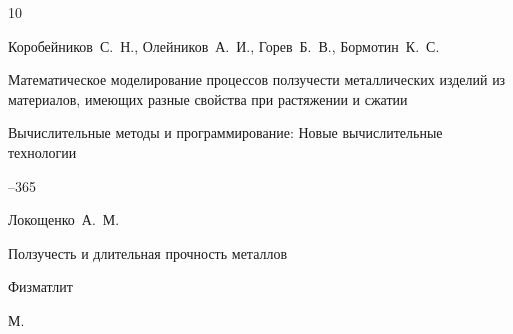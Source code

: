 \begin{thebibliography}{10}





\by  Коробейников~С.~Н., Олейников~А.~И., Горев~Б.~В., Бормотин~К.~С.

\paper Математическое моделирование процессов ползучести металлических изделий из материалов, имеющих разные свойства при растяжении и сжатии

\jour Вычислительные методы и программирование: Новые вычислительные технологии 




--365
















\by Локощенко~А.~М.

\book Ползучесть и длительная прочность металлов


\publ Физматлит

\publaddr М.






\end{thebibliography}
